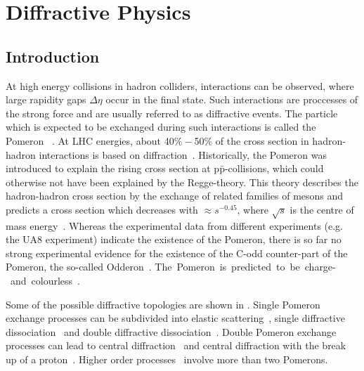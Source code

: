 \chapter{Diffractive Physics}\label{chap:diffractive_physics}
\section*{Introduction}
%
At high energy collisions in hadron colliders, interactions can be observed, where large rapidity gaps $\Delta \eta$ occur in the final state. Such interactions are proccesses of the strong force and are usually referred to as diffractive events. The particle which is expected to be exchanged during such interactions is called the Pomeron~\cite{donnachie2002pomeron}%
. At LHC energies, about 40$\%-$50$\%$ of the cross section in hadron-hadron interactions is based on diffraction~\cite{Hermes:1505271,LHCAcceleratorExperiments}. Historically, the Pomeron was introduced to explain the rising cross section at p$\bar{\text{p}}$-collisions, which could otherwise not have been explained by the Regge-theory. This theory describes the hadron-hadron cross section by the exchange of related families of mesons and predicts a cross section which decreases with \mbox{$\approx s^{-0.45}$}, where $\sqrt{s}$ is the centre of mass energy~\cite{pomeron}. Whereas the experimental data from different experiments (e.g. the UA8 experiment) indicate the existence of the Pomeron, there is so far no strong experimental evidence for the existence of the C-odd counter-part of the Pomeron, the so-called Odderon~\cite{pomeron}. \mbox{The Pomeron is predicted to be charge- and colourless~\cite{donnachie2002pomeron}.}

Some of the possible diffractive topologies are shown in . Single Pomeron exchange processes can be subdivided into elastic scattering~, single diffractive dissociation~ and double diffractive dissociation~. Double Pomeron exchange processes can lead to central diffraction~ and central diffraction with the break up of a proton~. Higher order processes~ involve more than two Pomerons.


